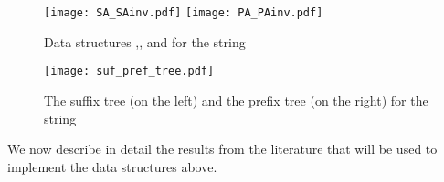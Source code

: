 \documentclass{article}
\newcommand{\?}{\mskip1.5mu}
\begin{document}
\begin{figure}[htb] 
\centering\texttt{[image: SA\_SAinv.pdf]} 
\texttt{[image: PA\_PAinv.pdf]} 

\caption[justification=centering]{Data structures ,, and  for the string } 

\label{pic:text_idx_DS} \end{figure}

\begin{figure}[htb] 
\centering\texttt{[image: suf\_pref\_tree.pdf]} 
\caption{The suffix tree (on the left) and the prefix tree (on the right) for the string } \label{pic:text_idx_DS2} \end{figure}

We now describe in detail the results from the literature that will be used to implement the data structures above. 
\end{document}
